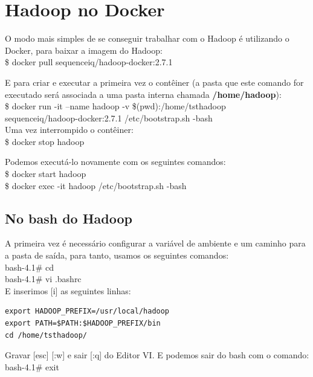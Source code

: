 \documentclass[a4paper,11pt]{article}
\begin{document}
\section{Hadoop no Docker}
O modo mais simples de se conseguir trabalhar com o Hadoop é utilizando o Docker, para baixar a imagem do Hadoop: \\
{\ttfamily\$ docker pull sequenceiq/hadoop-docker:2.7.1}

E para criar e executar a primeira vez o contêiner (a pasta que este comando for executado será associada a uma pasta interna chamada \textbf{/home/hadoop}): \\
{\ttfamily\$ docker run -it --name hadoop -v \$(pwd):/home/tsthadoop \\ sequenceiq/hadoop-docker:2.7.1 /etc/bootstrap.sh -bash} \\[2mm]
Uma vez interrompido o contêiner: \\
{\ttfamily\$ docker stop hadoop}

Podemos executá-lo novamente com os seguintes comandos: \\
{\ttfamily\$ docker start hadoop \\
\ttfamily\$ docker exec -it hadoop /etc/bootstrap.sh -bash}

\subsection{No bash do Hadoop}
A primeira vez é necessário configurar a variável de ambiente e um caminho para a pasta de saída, para tanto, usamos os seguintes comandos: \\
{\ttfamily bash-4.1\# cd ~ \\
 \ttfamily bash-4.1\# vi .bashrc} \\[2mm]
E inserimos [i] as seguintes linhas:
\begin{lstlisting}
export HADOOP_PREFIX=/usr/local/hadoop
export PATH=$PATH:$HADOOP_PREFIX/bin
cd /home/tsthadoop/
\end{lstlisting}
Gravar [esc] [:w] e sair [:q] do Editor VI. E podemos sair do bash com o comando: \\
{\ttfamily bash-4.1\# exit}
\end{document}

